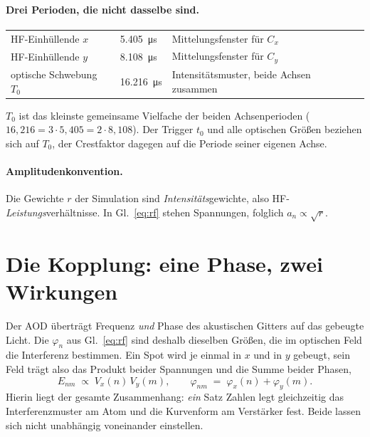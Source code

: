 \documentclass[11pt,a4paper]{article}
\newcommand{\crest}{\ensuremath{C}}
\begin{document}
\paragraph{Drei Perioden, die nicht dasselbe sind.}
\begin{center}
\begin{tabular}{@{}lll@{}}
  \toprule
  HF-Einhüllende $x$ & \SI{5.405}{\micro\second} & Mittelungsfenster für $\crest_x$\\
  HF-Einhüllende $y$ & \SI{8.108}{\micro\second} & Mittelungsfenster für $\crest_y$\\
  optische Schwebung $T_0$ & \SI{16.216}{\micro\second} & Intensitätsmuster, beide Achsen zusammen\\
  \bottomrule
\end{tabular}
\end{center}
$T_0$ ist das kleinste gemeinsame Vielfache der beiden Achsenperioden
($16{,}216 = 3\cdot5{,}405 = 2\cdot8{,}108$). Der Trigger $t_0$ und alle
optischen Größen beziehen sich auf $T_0$, der Crestfaktor dagegen auf die
Periode seiner eigenen Achse.

\paragraph{Amplitudenkonvention.}
Die Gewichte $r$ der Simulation sind \emph{Intensitäts}gewichte, also
HF-\emph{Leistungs}verhältnisse. In Gl.~\eqref{eq:rf} stehen Spannungen,
folglich $a_n \propto \sqrt{r}$.

\section{Die Kopplung: eine Phase, zwei Wirkungen}

Der AOD überträgt Frequenz \emph{und} Phase des akustischen Gitters auf das
gebeugte Licht. Die $\varphi_n$ aus Gl.~\eqref{eq:rf} sind deshalb dieselben
Größen, die im optischen Feld die Interferenz bestimmen. Ein Spot wird je
einmal in $x$ und in $y$ gebeugt, sein Feld trägt also das Produkt beider
Spannungen und die Summe beider Phasen,
\begin{equation}
  E_{nm} \;\propto\; V_x(n)\,V_y(m),
  \qquad
  \varphi_{nm} \;=\; \varphi_x(n) + \varphi_y(m).
  \label{eq:spotphase}
\end{equation}
Hierin liegt der gesamte Zusammenhang: \emph{ein} Satz Zahlen legt
gleichzeitig das Interferenzmuster am Atom und die Kurvenform am Verstärker
fest. Beide lassen sich nicht unabhängig voneinander einstellen.
\end{document}
